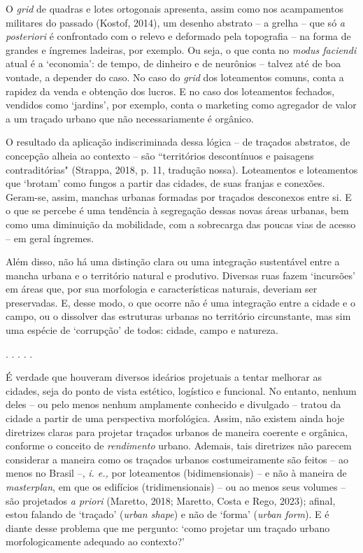 \documentclass[]{report}
\begin{document}
	O \textit{grid} de quadras e lotes ortogonais apresenta, assim como nos acampamentos militares do passado (Kostof, 2014), um desenho abstrato – a grelha – que só \textit{a posteriori} é confrontado com o relevo e deformado pela topografia – na forma de grandes e íngremes ladeiras, por exemplo. Ou seja, o que conta no \textit{modus faciendi} atual é a `economia': de tempo, de dinheiro e de neurônios – talvez até de boa vontade, a depender do caso. No caso do \textit{grid} dos loteamentos comuns, conta a rapidez da venda e obtenção dos lucros. E no caso dos loteamentos fechados, vendidos como `jardins', por exemplo, conta o marketing como agregador de valor a um traçado urbano que não necessariamente é orgânico.
	
	O resultado da aplicação indiscriminada dessa lógica – de traçados abstratos, de concepção alheia ao contexto – são ``territórios descontínuos e paisagens contraditórias" (Strappa, 2018, p. 11, tradução nossa). Loteamentos e loteamentos que `brotam' como fungos a partir das cidades, de suas franjas e conexões. Geram-se, assim, manchas urbanas formadas por traçados desconexos entre si. E o que se percebe é uma tendência à segregação dessas novas áreas urbanas, bem como uma diminuição da mobilidade, com a sobrecarga das poucas vias de acesso – em geral íngremes.

	Além disso, não há uma distinção clara ou uma integração sustentável entre a mancha urbana e o território natural e produtivo. Diversas ruas fazem `incursões' em áreas que, por sua morfologia e características naturais, deveriam ser preservadas. E, desse modo, o que ocorre não é uma integração entre a cidade e o campo, ou o dissolver das estruturas urbanas no território circunstante, mas sim uma espécie de `corrupção' de todos: cidade, campo e natureza.

	\begin{center}
		. . . . .
	\end{center}

	É verdade que houveram diversos ideários projetuais a tentar melhorar as cidades, seja do ponto de vista estético, logístico e funcional. No entanto, nenhum deles – ou pelo menos nenhum amplamente conhecido e divulgado – tratou da cidade a partir de uma perspectiva morfológica. Assim, não existem ainda hoje diretrizes claras para projetar traçados urbanos de maneira coerente e orgânica, conforme o conceito de \textit{rendimento} urbano. %
	Ademais, tais diretrizes não parecem considerar a maneira como os traçados urbanos costumeiramente são feitos – ao menos no Brasil –, \textit{i. e.,} por loteamentos (bidimensionais) – e não à maneira de \textit{masterplan}, em que os edifícios (tridimensionais) – ou ao menos seus volumes – são projetados \textit{a priori} (Maretto, 2018; Maretto, Costa e Rego, 2023); afinal, estou falando de `traçado' (\textit{urban shape}) e não de `forma' (\textit{urban form}). E é diante desse problema que me pergunto: `como projetar um traçado urbano morfologicamente adequado ao contexto?'
\end{document}
